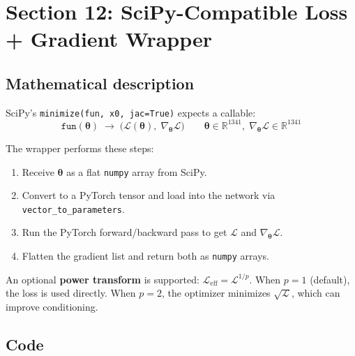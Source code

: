 \documentclass[11pt,a4paper]{article}
\begin{document}
\section{Section 12: SciPy-Compatible Loss + Gradient Wrapper}
\label{sec:wrapper}

\subsection*{Mathematical description}

SciPy's \texttt{minimize(fun, x0, jac=True)} expects a callable:
\[
  \texttt{fun}(\bm\theta) \;\to\;
  \bigl(\mathcal{L}(\bm\theta),\;
        \nabla_{\bm\theta}\mathcal{L}\bigr)
  \qquad
  \bm\theta \in \mathbb{R}^{1341},\;
  \nabla_{\bm\theta}\mathcal{L} \in \mathbb{R}^{1341}
\]

The wrapper performs these steps:
\begin{enumerate}[nosep]
  \item Receive $\bm\theta$ as a flat \texttt{numpy} array from SciPy.
  \item Convert to a PyTorch tensor and load into the network via
        \texttt{vector\_to\_parameters}.
  \item Run the PyTorch forward/backward pass to get $\mathcal{L}$ and
        $\nabla_{\bm\theta}\mathcal{L}$.
  \item Flatten the gradient list and return both as \texttt{numpy} arrays.
\end{enumerate}

An optional \textbf{power transform} is supported:
$\mathcal{L}_{\mathrm{eff}} = \mathcal{L}^{1/p}$.
When $p=1$ (default), the loss is used directly.  When $p=2$, the
optimizer minimizes $\sqrt{\mathcal{L}}$, which can improve conditioning.

\subsection*{Code}
\end{document}
